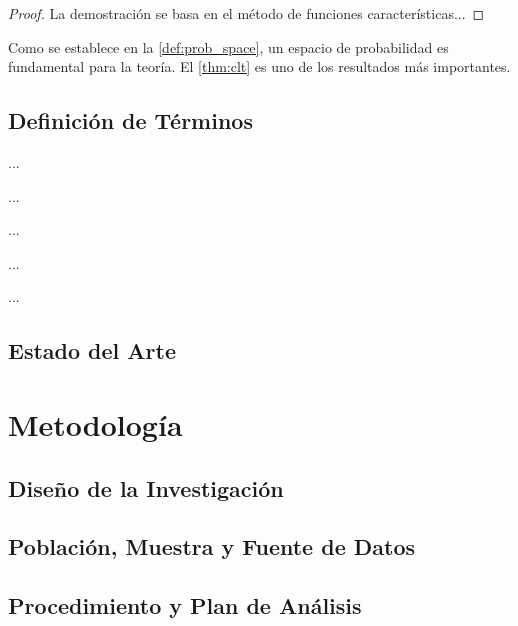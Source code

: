 \documentclass[12pt,a4paper,oneside]{book}
\theoremstyle{plain}
\theoremstyle{definition}
\theoremstyle{remark}
\begin{document}
\begin{proof}
La demostración se basa en el método de funciones características...
\end{proof}

Como se establece en la \cref{def:prob_space}, un espacio de probabilidad es fundamental para la teoría.
El \cref{thm:clt} es uno de los resultados más importantes.

\section{Definición de Términos}
\begin{description}[leftmargin=!,labelwidth=5cm]
  \item[Modelo estadístico:] ...
  \item[Estimación:] ...
  \item[Inferencia estadística:] ...
  \item[Validación:] ...
  \item[Error / incertidumbre:] ...
\end{description}

\section{Estado del Arte}
\lipsum[9-10]

\chapter{Metodología}

\section{Diseño de la Investigación}
\lipsum[11]

\section{Población, Muestra y Fuente de Datos}
\lipsum[12]

\section{Procedimiento y Plan de Análisis}
\lipsum[13]
\end{document}
